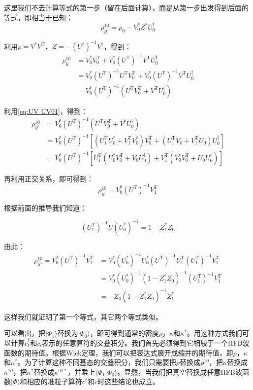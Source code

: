 \begin{booknote*}
这里我们不去计算等式的第一步（留在后面计算），而是从第一步出发得到后面的等式，即相当于已知：
\[
\rho^{10}_{ll^{\prime}}=\rho_{0}-V^{*}_{0}Z^{*}U^{\dagger}_{0}
\]

利用$\rho=V^{*}V^{\mathrm{T}}$，$Z=-(U^{\dagger})^{-1}V^{\dagger}$，得到：
\begin{align*}
\rho^{10}_{ll^{\prime}} & =V^{*}_{0}V^{\mathrm{T}}_{0}+V^{*}_{0}(U^{\mathrm{T}})^{-1}V^{\mathrm{T}}U^{\dagger}_{0}\\
 & =V^{*}_{0}(U^{\mathrm{T}})^{-1}U^{\mathrm{T}}V^{\mathrm{T}}_{0}+V^{*}_{0}(U^{\mathrm{T}})^{-1}V^{\mathrm{T}}U^{\dagger}_{0}\\
 & =V^{*}_{0}(U^{\mathrm{T}})^{-1}(U^{\mathrm{T}}V^{\mathrm{T}}_{0}+V^{\mathrm{T}}U^{\dagger}_{0})
\end{align*}

利用\ref{eq:UV UV01}，得到：
\begin{align*}
\rho^{10}_{ll^{\prime}} & =V^{*}_{0}(U^{\mathrm{T}})^{-1}(U^{\mathrm{T}}V^{\mathrm{T}}_{0}+V^{\dagger}U^{\dagger}_{0})\\
 & =V^{*}_{0}(U^{\mathrm{T}})^{-1}[(U^{\mathrm{T}}_{1}U^{*}_{0}+V^{\mathrm{T}}_{1}V^{*}_{0})V^{\mathrm{T}}_{0}+(U^{\mathrm{T}}_{1}V_{0}+V^{\mathrm{T}}_{1}U_{0})U^{\dagger}_{0}]\\
 & =V^{*}_{0}(U^{\mathrm{T}})^{-1}[U^{\mathrm{T}}_{1}(U^{*}_{0}V^{\mathrm{T}}_{0}+V_{0}U^{\dagger}_{0})+V^{\mathrm{T}}_{1}(V^{*}_{0}V^{\mathrm{T}}_{0}+U_{0}U^{\dagger}_{0})]
\end{align*}

再利用正交关系，即可得到：
\[
\rho^{10}_{ll^{\prime}}=V^{*}_{0}(U^{\mathrm{T}})^{-1}V^{\mathrm{T}}_{1}
\]

根据前面的推导我们知道：

\[
(U^{\mathrm{T}}_{1})^{-1}U(U^{*}_{0})^{-1}=1-Z^{*}_{1}Z_{0}
\]

由此：
\begin{align*}
\rho^{10}_{ll^{\prime}}=V^{*}_{0}(U^{\mathrm{T}})^{-1}V^{\mathrm{T}}_{1} & =V^{*}_{0}(U^{*}_{0})^{-1}U^{*}_{0}(U^{\mathrm{T}})^{-1}U^{\mathrm{T}}_{1}(U^{\mathrm{T}}_{1})^{-1}V^{\mathrm{T}}_{1}\\
 & =V^{*}_{0}(U^{*}_{0})^{-1}(1-Z^{*}_{1}Z_{0})^{-1}(U^{\mathrm{T}}_{1})^{-1}V^{\mathrm{T}}_{1}\\
 & =-Z_{0}(1-Z^{*}_{1}Z_{0})^{-1}Z^{*}_{1}
\end{align*}

这样我们就证明了第一个等式，其它两个等式类似。
\end{booknote*}
可以看出，把$|\Phi_{1}\rangle$替换为$|\Phi_{0}\rangle$，即可得到通常的密度$\rho$，$\kappa$和$\kappa^{*}$。用这种方式我们可以计算$c^{\dagger}_{l}$和$c_{l}$表示的任意算符的交叠积分。我们首先必须得到它相较于一个HFB波函数的期待值。根据Wick定理，我们可以把表达式展开成缩并的期待值，即$\rho$，$\kappa$和$\kappa^{*}$。为了计算这种不同基态的交叠积分，我们只需要把$\rho$替换成$\rho^{10}$，把$\kappa$替换成$\kappa^{10}$，把$\kappa^{*}$替换成$\kappa^{01*}$，并乘上$\langle\Phi_{1}|\Phi_{0}\rangle$。显然，当我们把真空替换成任意HFB波函数$|\Phi\rangle$和相应的准粒子算符$c^{\dagger}$和$c$时这些结论也成立。

